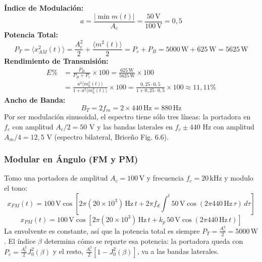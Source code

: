 \documentclass[11pt,a4paper]{article}
\numberwithin{equation}{section}
\begin{document}
\textbf{Índice de Modulación:}
\begin{equation}
  a = \frac{\lvert \min m(t) \rvert}{A_c}=\frac{50\,\mathrm{V}}{100\,\mathrm{V}}=0,5
\end{equation}
\textbf{Potencia Total:}
\begin{equation}
  P_T=\langle x_{AM}^2(t)\rangle =\frac{A_c^2}{2} + \frac{\langle m^2(t)\rangle }{2}= P_c + P_B = 5000\,\mathrm{W} + 625\,\mathrm{W} = 5625\,\mathrm{W}
\end{equation}
\textbf{Rendimiento de Transmisión:}
\begin{equation}
  \begin{aligned}
    E\%&=\frac{P_B}{P_B+P_c}\times 100=\frac{625\,\mathrm{W}}{5625\,\mathrm{W}}\times 100\\
       &=\frac{a^2\langle m_n^2(t)\rangle }{1+a^2\langle m_n^2(t)\rangle }\times 100=\frac{0,25\cdot 0,5}{1+0,25\cdot 0,5}\times 100\approx 11,11\%
  \end{aligned}
\end{equation}
\textbf{Ancho de Banda:}
\begin{equation}
  B_T=2f_m=2\times440\,\mathrm{Hz}=880\,\mathrm{Hz}
\end{equation}
Por ser modulación sinusoidal, el espectro tiene sólo tres líneas: la portadora en $f_c$ con amplitud $A_c/2=50$ V y las bandas laterales en $f_c\pm 440$ Hz con amplitud $A_m/4=12,5$ V (espectro bilateral, Briceño Fig. 6.6).

\subsubsection{Modular en Ángulo (FM y PM)}
Tomo una portadora de amplitud $A_c=100\,\mathrm{V}$ y frecuencia $f_c=20\,\mathrm{kHz}$ y modulo el tono:
\begin{equation}
  x_{FM}(t)=100\,\mathrm{V}\cos\left[ 2\pi (20\times 10^3)\,\mathrm{Hz}\,t + 2\pi f_d\int_{}^{t} 50\,\mathrm{V}\cos(2\pi 440\,\mathrm{Hz}\,\tau)\, d\tau \right]
\end{equation}
\begin{equation}
  x_{PM}(t)=100\,\mathrm{V}\cos[2\pi (20\times 10^3)\,\mathrm{Hz}\,t + k_p\,50\,\mathrm{V}\cos(2\pi 440\,\mathrm{Hz}\,t)]
\end{equation}
La envolvente es constante, así que la potencia total es siempre $P_T=\frac{A_c^2}{2}=5000\,\mathrm{W}$. El índice $\beta$ determina cómo se reparte esa potencia: la portadora queda con $P_c=\frac{A_c^2}{2}J_0^2(\beta)$ y el resto, $\frac{A_c^2}{2}[1-J_0^2(\beta)]$, va a las bandas laterales.
\end{document}

